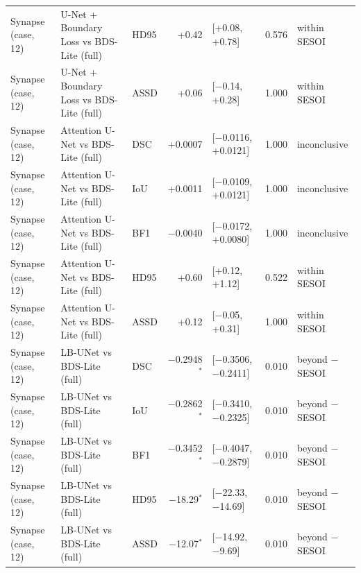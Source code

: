 \begin{tabular}{lllrlll}
Synapse (case, 12) & U-Net + Boundary Loss vs BDS-Lite (full) & HD95 & +0.42 & [+0.08, +0.78] & 0.576 & within SESOI \\
Synapse (case, 12) & U-Net + Boundary Loss vs BDS-Lite (full) & ASSD & +0.06 & [$-$0.14, +0.28] & 1.000 & within SESOI \\
Synapse (case, 12) & Attention U-Net vs BDS-Lite (full) & DSC & +0.0007 & [$-$0.0116, +0.0121] & 1.000 & inconclusive \\
Synapse (case, 12) & Attention U-Net vs BDS-Lite (full) & IoU & +0.0011 & [$-$0.0109, +0.0121] & 1.000 & inconclusive \\
Synapse (case, 12) & Attention U-Net vs BDS-Lite (full) & BF1 & $-$0.0040 & [$-$0.0172, +0.0080] & 1.000 & inconclusive \\
Synapse (case, 12) & Attention U-Net vs BDS-Lite (full) & HD95 & +0.60 & [+0.12, +1.12] & 0.522 & within SESOI \\
Synapse (case, 12) & Attention U-Net vs BDS-Lite (full) & ASSD & +0.12 & [$-$0.05, +0.31] & 1.000 & within SESOI \\
Synapse (case, 12) & LB-UNet vs BDS-Lite (full) & DSC & $-$0.2948$^{*}$ & [$-$0.3506, $-$0.2411] & 0.010 & beyond $-$SESOI \\
Synapse (case, 12) & LB-UNet vs BDS-Lite (full) & IoU & $-$0.2862$^{*}$ & [$-$0.3410, $-$0.2325] & 0.010 & beyond $-$SESOI \\
Synapse (case, 12) & LB-UNet vs BDS-Lite (full) & BF1 & $-$0.3452$^{*}$ & [$-$0.4047, $-$0.2879] & 0.010 & beyond $-$SESOI \\
Synapse (case, 12) & LB-UNet vs BDS-Lite (full) & HD95 & $-$18.29$^{*}$ & [$-$22.33, $-$14.69] & 0.010 & beyond $-$SESOI \\
Synapse (case, 12) & LB-UNet vs BDS-Lite (full) & ASSD & $-$12.07$^{*}$ & [$-$14.92, $-$9.69] & 0.010 & beyond $-$SESOI \\
\bottomrule
\end{tabular}
